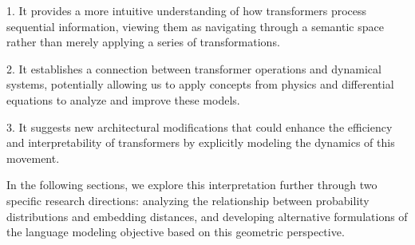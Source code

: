 1. It provides a more intuitive understanding of how transformers process sequential information, viewing them as navigating through a semantic space rather than merely applying a series of transformations.

2. It establishes a connection between transformer operations and dynamical systems, potentially allowing us to apply concepts from physics and differential equations to analyze and improve these models.

3. It suggests new architectural modifications that could enhance the efficiency and interpretability of transformers by explicitly modeling the dynamics of this movement.

In the following sections, we explore this interpretation further through two specific research directions: analyzing the relationship between probability distributions and embedding distances, and developing alternative formulations of the language modeling objective based on this geometric perspective.
